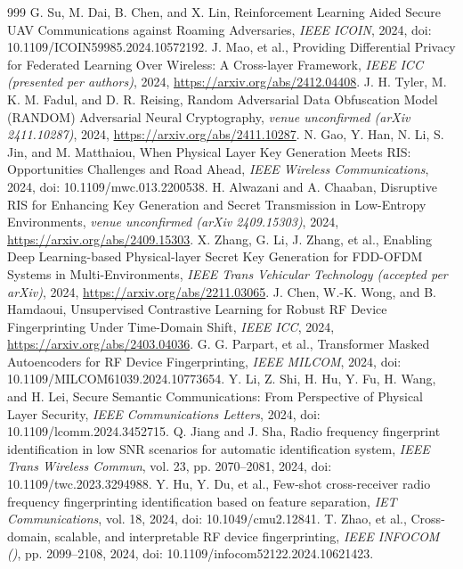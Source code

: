 \documentclass[10.5pt,compsoc,winfonts]{ICN}
\begin{document}
\begin{thebibliography}{999}
G. Su, M. Dai, B. Chen, and X. Lin, Reinforcement Learning Aided Secure UAV Communications against Roaming Adversaries, \emph{IEEE ICOIN}, 2024, doi: 10.1109/ICOIN59985.2024.10572192.
J. Mao, et al., Providing Differential Privacy for Federated Learning Over Wireless: A Cross-layer Framework, \emph{IEEE ICC (presented per authors)}, 2024, \url{https://arxiv.org/abs/2412.04408}.
J. H. Tyler, M. K. M. Fadul, and D. R. Reising, Random Adversarial Data Obfuscation Model (RANDOM) Adversarial Neural Cryptography, \emph{venue unconfirmed (arXiv 2411.10287)}, 2024, \url{https://arxiv.org/abs/2411.10287}.
N. Gao, Y. Han, N. Li, S. Jin, and M. Matthaiou, When Physical Layer Key Generation Meets RIS: Opportunities Challenges and Road Ahead, \emph{IEEE Wireless Communications}, 2024, doi: 10.1109/mwc.013.2200538.
H. Alwazani and A. Chaaban, Disruptive RIS for Enhancing Key Generation and Secret Transmission in Low-Entropy Environments, \emph{venue unconfirmed (arXiv 2409.15303)}, 2024, \url{https://arxiv.org/abs/2409.15303}.
X. Zhang, G. Li, J. Zhang, et al., Enabling Deep Learning-based Physical-layer Secret Key Generation for FDD-OFDM Systems in Multi-Environments, \emph{IEEE Trans Vehicular Technology (accepted per arXiv)}, 2024, \url{https://arxiv.org/abs/2211.03065}.
J. Chen, W.-K. Wong, and B. Hamdaoui, Unsupervised Contrastive Learning for Robust RF Device Fingerprinting Under Time-Domain Shift, \emph{IEEE ICC}, 2024, \url{https://arxiv.org/abs/2403.04036}.
G. G. Parpart, et al., Transformer Masked Autoencoders for RF Device Fingerprinting, \emph{IEEE MILCOM}, 2024, doi: 10.1109/MILCOM61039.2024.10773654.
Y. Li, Z. Shi, H. Hu, Y. Fu, H. Wang, and H. Lei, Secure Semantic Communications: From Perspective of Physical Layer Security, \emph{IEEE Communications Letters}, 2024, doi: 10.1109/lcomm.2024.3452715.
Q. Jiang and J. Sha, Radio frequency fingerprint identification in low SNR scenarios for automatic identification system, \emph{IEEE Trans Wireless Commun}, vol. 23, pp. 2070–2081, 2024, doi: 10.1109/twc.2023.3294988.
Y. Hu, Y. Du, et al., Few-shot cross-receiver radio frequency fingerprinting identification based on feature separation, \emph{IET Communications}, vol. 18, 2024, doi: 10.1049/cmu2.12841.
T. Zhao, et al., Cross-domain, scalable, and interpretable RF device fingerprinting, \emph{IEEE INFOCOM ()}, pp. 2099–2108, 2024, doi: 10.1109/infocom52122.2024.10621423.

\end{thebibliography}
\end{document}
